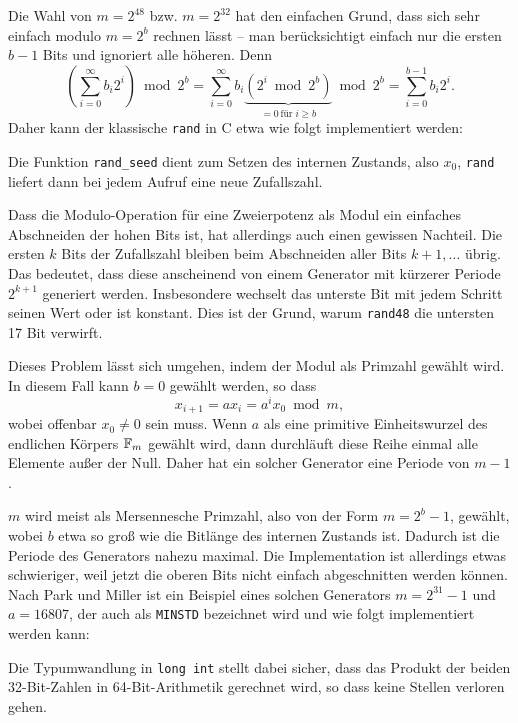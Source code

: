 Die Wahl von $m=2^{48}$ bzw. $m=2^{32}$ hat den einfachen Grund, dass
sich sehr einfach modulo $m=2^b$ rechnen lässt -- man berücksichtigt
einfach nur die ersten $b-1$ Bits und ignoriert alle höheren. Denn
\begin{equation}
  \label{eq:lcgmod}
  \left(\sum_{i=0}^\infty b_i 2^i\right) \bmod 2^b =
  \sum_{i=0}^\infty b_i \underbrace{\left(  2^i \bmod 2^b \right)}_{=
      0\,\text{für}\; i\ge b} \bmod 2^b = \sum_{i=0}^{b-1} b_i 2^i.
\end{equation}
Daher kann der klassische \texttt{rand} in C etwa wie folgt
implementiert werden:

Die Funktion \lstinline!rand_seed! dient zum Setzen des internen Zustands,
also $x_0$, \lstinline!rand! liefert dann bei jedem Aufruf eine neue
Zufallszahl.

Dass die Modulo-Operation für eine Zweierpotenz als Modul ein
einfaches Abschneiden der hohen Bits ist, hat allerdings auch einen
gewissen Nachteil.  Die ersten $k$ Bits der Zufallszahl bleiben beim
Abschneiden aller Bits $k+1,\ldots$ übrig.  Das bedeutet, dass diese
anscheinend von einem Generator mit kürzerer Periode $2^{k+1}$
generiert werden.  Insbesondere wechselt das unterste Bit mit jedem
Schritt seinen Wert oder ist konstant.  Dies ist der Grund, warum
\texttt{rand48} die untersten 17 Bit verwirft.

Dieses Problem lässt sich umgehen, indem der Modul als Primzahl
gewählt wird. In diesem Fall kann $b=0$ gewählt werden, so dass
\begin{equation}
  x_{i+1} = a x_i = a^i x_0 \bmod m,
\end{equation}
wobei offenbar $x_0\neq 0$ sein muss. Wenn $a$ als eine primitive
Einheitswurzel des endlichen Körpers $\mathbb{F}_m$ gewählt wird, dann
durchläuft diese Reihe einmal alle Elemente außer der Null. Daher hat
ein solcher Generator eine Periode von $m-1$.

$m$ wird meist als Mersennesche Primzahl, also von der Form $m=2^b -
1$, gewählt, wobei $b$ etwa so groß wie die Bitlänge des internen
Zustands ist. Dadurch ist die Periode des Generators nahezu maximal.
Die Implementation ist allerdings etwas schwieriger, weil jetzt die
oberen Bits nicht einfach abgeschnitten werden können. Nach Park und
Miller ist ein Beispiel eines solchen Generators $m=2^{31}-1$ und
$a=16807$, der auch als \texttt{MINSTD} bezeichnet wird und wie folgt
implementiert werden kann:

Die Typumwandlung in \lstinline!long int! stellt dabei sicher, dass
das Produkt der beiden 32-Bit-Zahlen in 64-Bit-Arithmetik gerechnet
wird, so dass keine Stellen verloren gehen.

